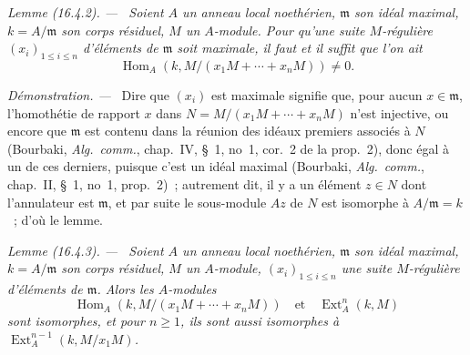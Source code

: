 \documentclass[10pt,oneside]{book}
\makeatletter
\newcommand{\setmanualcurrentlabel}[1]{\def\@currentlabel{#1}}
\newcommand{\oldpage}[2][]{%
  \setcounter{footnote}{0}%
  \marginpar{\scriptsize\textbf{#1}~|~#2}\ignorespaces}
\newenvironment{lemma}[1][]{%
  \setmanualcurrentlabel{#1}\par\medskip\noindent\itshape Lemme (#1). ---\ }{\par}
\newenvironment{proof}{%
  \par\medskip\noindent\textit{Démonstration. ---\ }}{\par}
\makeatother
\begin{document}
\begin{lemma}[16.4.2]
\label{0.16.4.2-fr}
Soient $A$ un anneau local noethérien, $\mathfrak{m}$ son idéal maximal,
$k=A/\mathfrak{m}$ son corps résiduel, $M$ un $A$-module. Pour qu'une suite
$M$-régulière $(x_i)_{1\leq i\leq n}$ d'éléments de $\mathfrak{m}$ soit
maximale, il faut et il suffit que l'on ait
\[
  \operatorname{Hom}_A(k,M/(x_1M+\cdots+x_nM))\neq0.
\]
\end{lemma}

\begin{proof}
Dire que $(x_i)$ est maximale signifie que, pour aucun $x\in\mathfrak{m}$,
l'homothétie de rapport $x$ dans $N=M/(x_1M+\cdots+x_nM)$ n'est injective, ou
encore que $\mathfrak{m}$ est contenu dans la réunion des idéaux premiers
associés à $N$ (Bourbaki, \emph{Alg.~comm.}, chap.~IV, \S~1, no~1, cor.~2 de
la prop.~2), donc égal à un de ces derniers, puisque c'est un idéal
\oldpage[0\textsubscript{IV-1}]{33}
maximal (Bourbaki, \emph{Alg.~comm.}, chap.~II, \S~1, no~1, prop.~2)~;
autrement dit, il y a un élément $z\in N$ dont l'annulateur est
$\mathfrak{m}$, et par suite le sous-module $Az$ de $N$ est isomorphe à
$A/\mathfrak{m}=k$~; d'où le lemme.
\end{proof}

\begin{lemma}[16.4.3]
\label{0.16.4.3-fr}
Soient $A$ un anneau local noethérien, $\mathfrak{m}$ son idéal maximal,
$k=A/\mathfrak{m}$ son corps résiduel, $M$ un $A$-module,
$(x_i)_{1\leq i\leq n}$ une suite $M$-régulière d'éléments de
$\mathfrak{m}$. Alors les $A$-modules
\[
  \operatorname{Hom}_A(k,M/(x_1M+\cdots+x_nM))
  \quad\text{et}\quad \operatorname{Ext}^n_A(k,M)
\]
sont isomorphes, et pour $n\geq1$, ils sont aussi isomorphes à
$\operatorname{Ext}^{n-1}_A(k,M/x_1M)$.
\end{lemma}
\end{document}
